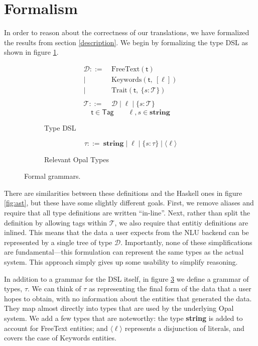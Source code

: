 \documentclass[twocolumn]{article}
\newcommand{\fcy}[1]{\mathcal{#1}}
\newcommand{\etag}[1]{\textsf{#1}}
\newcommand{\ff}[1]{\textsf{#1}}
\begin{document}
\section{Formalism} \label{formalism}
In order to reason about the correctness of our translations, we have formalized
the results from section \ref{description}. We begin by formalizing the type DSL
as shown in figure \ref{fig:grammar_a}.
\begin{figure}
  \centering
  \begin{subfigure}{1\linewidth}
    \begin{align*}
      \fcy{D} ::=&\ \text{FreeText}(\etag{t}) \\
      |&\ \text{Keywords}(\etag{t},\ [\ell]) \\
      |&\ \text{Trait}(\etag{t},\ \{s: \fcy{T}\}) \\
      \\
      \fcy{T} ::=&\ \fcy{D} \mid \ell \mid \{s: \fcy{T}\}
    \end{align*}
    $$ \etag{t} \in \ff{Tag} \qquad \ell, s \in \textbf{string} $$
    \caption{Type DSL}
    \label{fig:grammar_a}
  \end{subfigure}\vspace{1cm}
  \begin{subfigure}{1\linewidth}
    $$ \tau ::=\ \textbf{string} \mid \ell \mid \{s: \tau\} \mid \langle \ell
    \rangle $$
    \caption{Relevant Opal Types}
    \label{fig:grammar_b}
  \end{subfigure}
  \caption{Formal grammars.}
\end{figure}
There are similarities between these definitions and the Haskell ones in figure
\ref{fig:ast}, but these have some slightly different goals. First, we remove
aliases and require that all type definitions are written ``in-line''. Next,
rather than split the definition by allowing tags within $\fcy{T}$, we also
require that entitiy definitions are inlined. This means that the data a user
expects from the NLU backend can be represented by a single tree of type
$\fcy{D}$. Importantly, none of these simplifications are fundamental---this
formulation can represent the same types as the actual system. This approach
simply gives up some usability to simplify reasoning.

In addition to a grammar for the DSL itself, in figure \ref{fig:grammar_b} we
define a grammar of types, $\tau$. We can think of $\tau$ as representing the
final form of the data that a user hopes to obtain, with no information about
the entities that generated the data. They map almost directly into types that
are used by the underlying Opal system. We add a few types that are noteworthy:
the type {\bf string} is added to account for FreeText entities; and $\langle
{\ell} \rangle$ represents a disjunction of literals, and covers the case of
Keywords entities.
\end{document}
